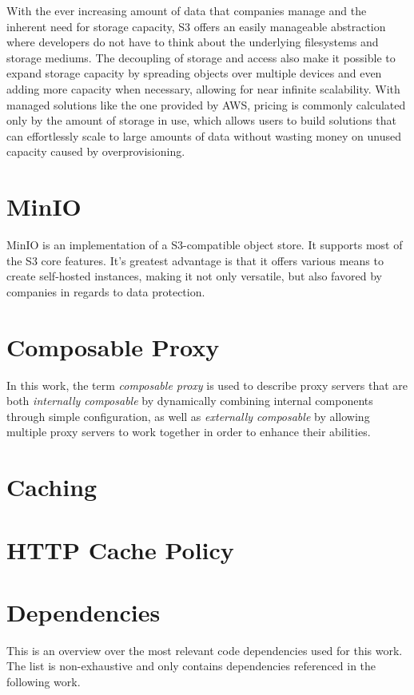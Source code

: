 With the ever increasing amount of data that companies manage and the inherent need for storage capacity, S3 offers an easily manageable abstraction where developers do not have to think about the underlying filesystems and storage mediums. The decoupling of storage and access also make it possible to expand storage capacity by spreading objects over multiple devices and even adding more capacity when necessary, allowing for near infinite scalability. With managed solutions like the one provided by AWS, pricing is commonly calculated only by the amount of storage in use, which allows users to build solutions that can effortlessly scale to large amounts of data without wasting money on unused capacity caused by overprovisioning.

\section{MinIO}
MinIO is an implementation of a S3-compatible object store. It supports most of the S3 core features. It's greatest advantage is that it offers various means to create self-hosted instances, making it not only versatile, but also favored by companies in regards to data protection.

\section{Composable Proxy}
In this work, the term \textit{composable proxy} is used to describe proxy servers that are both \textit{internally composable} by dynamically combining internal components through simple configuration, as well as \textit{externally composable} by allowing multiple proxy servers to work together in order to enhance their abilities.

\section{Caching}

\section{HTTP Cache Policy}


\section{Dependencies}
This is an overview over the most relevant code dependencies used for this work. The list is non-exhaustive and only contains dependencies referenced in the following work.

